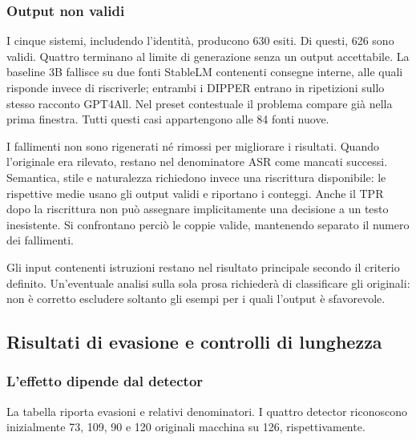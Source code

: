\documentclass[11pt,a4paper]{article}
\begin{document}
\subsubsection{Output non validi}\label{output-non-validi}

I cinque sistemi, includendo l'identità, producono 630 esiti. Di questi, 626 sono validi. Quattro terminano al limite di generazione senza un output accettabile. La baseline 3B fallisce su due fonti StableLM contenenti consegne interne, alle quali risponde invece di riscriverle; entrambi i DIPPER entrano in ripetizioni sullo stesso racconto GPT4All. Nel preset contestuale il problema compare già nella prima finestra. Tutti questi casi appartengono alle 84 fonti nuove.

I fallimenti non sono rigenerati né rimossi per migliorare i risultati. Quando l'originale era rilevato, restano nel denominatore ASR come mancati successi. Semantica, stile e naturalezza richiedono invece una riscrittura disponibile: le rispettive medie usano gli output validi e riportano i conteggi. Anche il TPR dopo la riscrittura non può assegnare implicitamente una decisione a un testo inesistente. Si confrontano perciò le coppie valide, mantenendo separato il numero dei fallimenti.

Gli input contenenti istruzioni restano nel risultato principale secondo il criterio definito. Un'eventuale analisi sulla sola prosa richiederà di classificare gli originali: non è corretto escludere soltanto gli esempi per i quali l'output è sfavorevole.

\subsection{Risultati di evasione e controlli di lunghezza}\label{risultati-di-evasione-e-controlli-di-lunghezza}

\subsubsection{L'effetto dipende dal detector}\label{leffetto-dipende-dal-detector}

La tabella riporta evasioni e relativi denominatori. I quattro detector riconoscono inizialmente 73, 109, 90 e 120 originali macchina su 126, rispettivamente.
\end{document}
